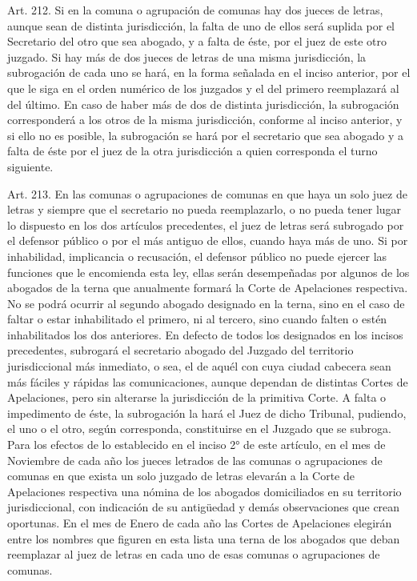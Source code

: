     Art. 212. Si en la comuna o agrupación de comunas hay dos jueces de letras, aunque sean de distinta jurisdicción, la falta de uno de ellos será suplida por el Secretario del otro que sea abogado, y a falta de éste, por el juez de este otro juzgado.
    Si hay más de dos jueces de letras de una misma jurisdicción, la subrogación de cada uno se hará, en la forma señalada en el inciso anterior, por el que le siga en el orden numérico de los juzgados y el del primero reemplazará al del último.
    En caso de haber más de dos de distinta jurisdicción, la subrogación corresponderá a los otros de la misma jurisdicción, conforme al inciso anterior, y si ello no es posible, la subrogación se hará por el secretario que sea abogado y a falta de éste por el juez de la otra jurisdicción a quien corresponda el turno siguiente.


    Art. 213. En las comunas o agrupaciones de comunas en que haya un solo juez de letras y siempre que el secretario no pueda reemplazarlo, o no pueda tener lugar lo dispuesto en los dos artículos precedentes, el juez de letras será subrogado por el defensor público o por el más antiguo de ellos, cuando haya más de uno.
    Si por inhabilidad, implicancia o recusación, el defensor público no puede ejercer las funciones que le encomienda esta ley, ellas serán desempeñadas por algunos de los abogados de la terna que anualmente formará la Corte de Apelaciones respectiva. No se podrá ocurrir al segundo abogado designado en la terna, sino en el caso de faltar o estar inhabilitado el primero, ni al tercero, sino cuando falten o estén inhabilitados los dos anteriores.
    En defecto de todos los designados en los incisos precedentes, subrogará el secretario abogado del Juzgado del territorio jurisdiccional más inmediato, o sea, el de aquél con cuya ciudad cabecera sean más fáciles y rápidas las comunicaciones, aunque dependan de distintas Cortes de Apelaciones, pero sin alterarse la jurisdicción de la primitiva Corte. A falta o impedimento de éste, la subrogación la hará el Juez de dicho Tribunal, pudiendo, el uno o el otro, según corresponda, constituirse en el Juzgado que se subroga.
    Para los efectos de lo establecido en el inciso 2° de este artículo, en el mes de Noviembre de cada año los jueces letrados de las comunas o agrupaciones de comunas en que exista un solo juzgado de letras elevarán a la Corte de Apelaciones respectiva una nómina de los abogados domiciliados en su territorio jurisdiccional, con indicación de su antigüedad y demás observaciones que crean oportunas. En el mes de Enero de cada año las Cortes de Apelaciones elegirán entre los nombres que figuren en esta lista una terna de los abogados que deban reemplazar al juez de letras en cada uno de esas comunas o agrupaciones de comunas.




